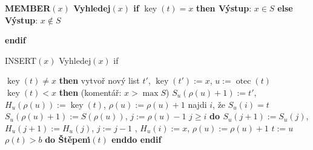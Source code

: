 \documentclass[a4paper,12pt]{article}
\DeclareMathOperator*{\otec}{otec}
\DeclareMathOperator*{\key}{key}
\begin{document}
{\bf MEMBER$(x)$\newline 
Vyhledej$(x)$\newline 
if} $\key(t)=x$ {\bf then V\'ystup}: $x\in S$ {\bf else V\'ystup}: $x\notin S$ {\bf endif
\medskip

INSERT$(x)$\newline
Vyhledej$(x)$\newline 
if} $\key(t)\ne x$ {\bf then}\newline 
\phantom{---}vytvo\v r nov\'y list $t'$, $\key(t'):=x$, $u:=\otec(t)$\newline 
\phantom{---}{\bf if} $\key(t)<x$ {\bf then}\newline 
(koment\'a\v r: $x>\max S$)\newline 
\phantom{------}$S_u(\rho (u)+1):=t'$, $H_u(\rho (u)):=\key(t)$, $\rho (u):=\rho 
(u)+1$\newline 
\phantom{---}{\bf else}\newline 
\phantom{------}najdi $i$, \v ze $S_u(i)=t$\newline 
\phantom{------}$S_u(\rho (u)+1):=S(\rho (u))$, $j:=\rho (u)-1$\newline 
\phantom{------}{\bf while} $j\ge i$ {\bf do\newline 
\phantom{---------}$S_u(j+1):=S_u(j)$}, $H_u(j+1):=H_u(j)$, $j:=j-1$\newline 
{}, $H_u(i):=x$, $\rho (u):=\rho (u)+1$\newline 
\phantom{---}{\bf endif}\newline 
\phantom{---}$t:=u$\newline 
\phantom{---}{\bf while} $\rho (t)>b$ {\bf do \v St\v epen\'\i$(t)$ enddo\newline 
endif}
\medskip
\end{document}
